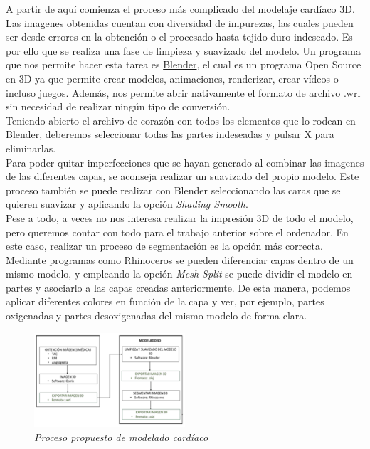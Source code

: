 \documentclass[a4paper,12pt]{article}
\begin{document}
A partir de aquí comienza el proceso más complicado del modelaje cardíaco 3D. Las imagenes obtenidas cuentan con diversidad de impurezas, las cuales pueden ser desde errores en la obtención o el procesado hasta tejido duro indeseado. Es por ello que se realiza una fase de limpieza y suavizado del modelo. Un programa que nos permite hacer esta tarea es \href{https://www.blender.org/}{Blender}, el cual es un programa Open Source en 3D ya que permite crear modelos, animaciones, renderizar, crear vídeos o incluso juegos. Además, nos permite abrir nativamente el formato de archivo .wrl sin necesidad de realizar ningún tipo de conversión.\\

Teniendo abierto el archivo de corazón con todos los elementos que lo rodean en Blender, deberemos seleccionar todas las partes indeseadas y pulsar X para eliminarlas.\\

Para poder quitar imperfecciones que se hayan generado al combinar las imagenes de las diferentes capas, se aconseja realizar un suavizado del propio modelo. Este proceso también se puede realizar con Blender seleccionando las caras que se quieren suavizar y aplicando la opción \emph{Shading Smooth}.\\

Pese a todo, a veces no nos interesa realizar la impresión 3D de todo el modelo, pero queremos contar con todo para el trabajo anterior sobre el ordenador. En este caso, realizar un proceso de segmentación es la opción más correcta. Mediante programas como \href{https://www.rhino3d.com/}{Rhinoceros} se pueden diferenciar capas dentro de un mismo modelo, y empleando la opción \emph{Mesh Split} se puede dividir el modelo en partes y asociarlo a las capas creadas anteriormente. De esta manera, podemos aplicar diferentes colores en función de la capa y ver, por ejemplo, partes oxigenadas y partes desoxigenadas del mismo modelo de forma clara.\\

	\begin{figure}[!ht]
	\begin{center}
	  \includegraphics[width=0.5\textwidth]{Figuras/modeloCardio.png}
	  \caption{\emph{Proceso propuesto de modelado cardíaco}}
	\end{center}
	\label{modeloCardio}
	\end{figure}
\end{document}
